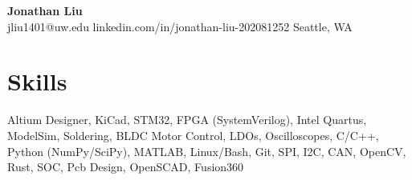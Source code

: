 \documentclass[11pt,letterpaper]{article}
\begin{document}
\begin{center}
{\LARGE \textbf{Jonathan Liu}}\\[2pt]
\small jliu1401@uw.edu \textbullet{} linkedin.com/in/jonathan-liu-202081252 \textbullet{} Seattle, WA
\end{center}
\section*{Skills}
Altium Designer, KiCad, STM32, FPGA (SystemVerilog), Intel Quartus, ModelSim, Soldering, BLDC Motor Control, LDOs, Oscilloscopes, C/C++, Python (NumPy/SciPy), MATLAB, Linux/Bash, Git, SPI, I2C, CAN, OpenCV, Rust, SOC, Pcb Design, OpenSCAD, Fusion360
\end{document}

